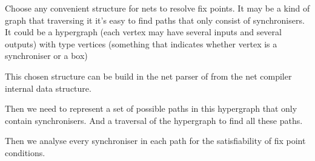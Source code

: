Choose any convenient structure for nets to resolve fix points. It may be a kind of graph that traversing it it's easy to find paths that only consist of synchronisers.
It could be a hypergraph (each vertex may have several inputs and several outputs) with type vertices (something that indicates whether vertex is a synchroniser or a box)

This chosen structure can be build in the net parser of from the net compiler internal data structure.

Then we need to represent a set of possible paths in this hypergraph that only contain synchronisers. And a traversal of the hypergraph to find all these paths.

Then we analyse every synchroniser in each path for the satisfiability of fix point conditions.

